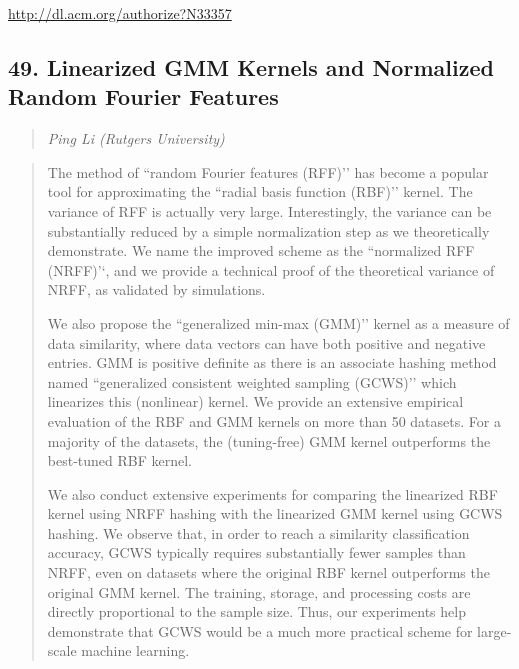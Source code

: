 \documentclass{article}
\begin{document}
\href{http://dl.acm.org/authorize?N33357}{http://dl.acm.org/authorize?N33357}

\subsection{49. Linearized GMM Kernels and Normalized Random Fourier Features}

\begin{quote}
\footnotesize{\textit{Ping Li (Rutgers University)}}

\end{quote}

\begin{quote}
The method of ``random Fourier features (RFF)’’ has become a popular tool for approximating the ``radial basis function (RBF)’’ kernel. The variance of RFF is actually very large. Interestingly, the variance can be substantially reduced by a simple normalization step as we theoretically demonstrate. We name the improved scheme as the ``normalized RFF (NRFF)’‘, and we provide a technical proof of the theoretical variance of NRFF, as validated by simulations.







 We also propose the ``generalized min-max (GMM)’’ kernel as a measure of data similarity, where data vectors can have both positive and negative entries. GMM is positive definite as there is an associate hashing method named ``generalized consistent weighted sampling (GCWS)’’ which linearizes this (nonlinear) kernel. We provide an extensive empirical evaluation of the RBF and GMM kernels on more than 50 datasets. For a majority of the datasets, the (tuning-free) GMM kernel outperforms the best-tuned RBF kernel.







 We also conduct extensive experiments for comparing the linearized RBF kernel using NRFF hashing with the linearized GMM kernel using GCWS hashing. We observe that, in order to reach a similarity classification accuracy, GCWS typically requires substantially fewer samples than NRFF, even on datasets where the original RBF kernel outperforms the original GMM kernel. The training, storage, and processing costs are directly proportional to the sample size. Thus, our experiments help demonstrate that GCWS would be a much more practical scheme for large-scale machine learning.








\end{quote}
\end{document}
